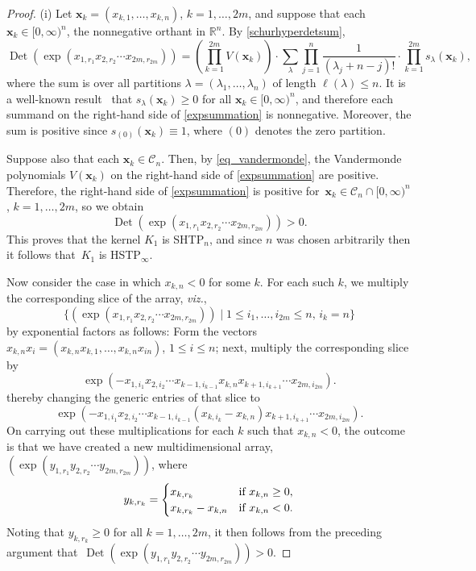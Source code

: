 \documentclass[pdftex]{sigma}
\numberwithin{equation}{section}
\def\R{{\mathbb R}}
\def\Det{\operatorname{Det}}
\def\CC{\mathcal{C}}
\def\xx{\boldsymbol{x}}
\begin{document}
\begin{proof}
(i) Let $\xx_k = (x_{k,1},\dots,x_{k,n})$, $k=1,\dots,2m$, and suppose that each $\xx_k \in [0,\infty)^n$, the nonnegative orthant in $\R^n$. By
\eqref{schurhyperdetsum},
\begin{equation}
\Det(\exp(x_{1,r_1} x_{2,r_2} \cdots x_{2m,r_{2m}})) = \left(\prod_{k=1}^{2m} V(\xx_k)\right) \cdot \sum_\lambda \prod_{j=1}^n \frac{1}{(\lambda_j + n-j)!} \cdot \prod_{k=1}^{2m} s_\lambda(\xx_k),\label{expsummation}
\end{equation}
where the sum is over all partitions $\lambda = (\lambda_1,\dots,\lambda_n)$ of length $\ell(\lambda) \le n$.
It is a well-known result~\cite{grossrichards89,macdonald} that $s_\lambda(\xx_k) \ge 0$ for all $\xx_k \in [0,\infty)^n$, and therefore each summand on the right-hand side of \eqref{expsummation} is nonnegative. Moreover, the sum is positive since $s_{(0)}(\xx_k) \equiv 1$, where $(0)$ denotes the zero partition.

Suppose also that each $\xx_k \in \CC_n$. Then, by \eqref{eq_vandermonde}, the Vandermonde polynomials $V(\xx_k)$ on the right-hand side of \eqref{expsummation} are positive. Therefore, the right-hand side of \eqref{expsummation} is positive for~${\xx_k \in \CC_n \cap [0,\infty)^n}$, $k=1,\dots,2m$, so we obtain
\[
\Det(\exp(x_{1,r_1} x_{2,r_2} \cdots x_{2m,r_{2m}})) > 0.
\]
This proves that the kernel $K_1$ is SHTP$_n$, and since $n$ was chosen arbitrarily then it follows that~$K_1$ is HSTP$_\infty$.

Now consider the case in which $x_{k,n} < 0$ for some $k$. For each such $k$, we multiply the corresponding slice of the array, {\it viz.},
\[
\{(\exp(x_{1,r_1} x_{2,r_2} \cdots x_{2m,r_{2m}})) \mid 1 \le i_1,\dots,i_{2m} \le n,\, i_k = n\}
\]
by exponential factors as follows: Form the vectors $x_{k,n}x_i = (x_{k,n}x_{k,1},\dots,x_{k,n}x_{in})$, $1 \le i \le n$; next, multiply the corresponding slice by
\[
\exp(-x_{1,i_1}x_{2,i_2} \cdots x_{k-1,i_{k-1}}x_{k,n}x_{k+1,i_{k+1}}\cdots x_{2m,i_{2m}}).
\]
thereby changing the generic entries of that slice to
\[
\exp(-x_{1,i_1}x_{2,i_2} \cdots x_{k-1,i_{k-1}}(x_{k,i_k}-x_{k,n})x_{k+1,i_{k+1}}\cdots x_{2m,i_{2m}}).
\]
On carrying out these multiplications for each $k$ such that $x_{k,n} < 0$, the outcome is that we have created a new multidimensional array, $(\exp(y_{1,r_1} y_{2,r_2} \cdots y_{2m,r_{2m}}))$, where
\[
y_{k,r_k} =
\begin{cases}
x_{k,r_k} & \hbox{if } x_{k,n} \ge 0, \\
x_{k,r_k} - x_{k,n} & \hbox{if } x_{k,n} < 0.
\end{cases}
\]
Noting that $y_{k,r_k} \ge 0$ for all $k=1,\dots,2m$, it then follows from the preceding argument that~${\Det(\exp(y_{1,r_1} y_{2,r_2} \cdots y_{2m,r_{2m}})) > 0}$.


\end{proof}
\end{document}
